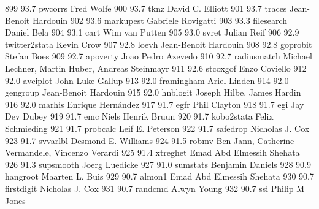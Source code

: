    899     93.7    pwcorrs       Fred Wolfe                              
   900     93.7    tknz          David C. Elliott                        
   901     93.7    traces        Jean-Benoit Hardouin                    
   902     93.6    markupest     Gabriele Rovigatti                      
   903     93.3    filesearch    Daniel Bela                             
   904     93.1    cart          Wim van Putten                          
   905     93.0    svret         Julian Reif                             
   906     92.9    twitter2stata  Kevin Crow                              
   907     92.8    loevh         Jean-Benoit Hardouin                    
   908     92.8    goprobit      Stefan Boes                             
   909     92.7    apoverty      Joao Pedro Azevedo                      
   910     92.7    radiusmatch   Michael Lechner, Martin Huber, Andreas  
                                   Steinmayr                               
   911     92.6    stcoxgof      Enzo Coviello                           
   912     92.0    avciplot      John Luke Gallup                        
   913     92.0    framingham    Ariel Linden                            
   914     92.0    gengroup      Jean-Benoit Hardouin                    
   915     92.0    hnblogit      Joseph Hilbe, James Hardin              
   916     92.0    marhis        Enrique Hernández                      
   917     91.7    egfr          Phil Clayton                            
   918     91.7    egi           Jay Dev Dubey                           
   919     91.7    emc           Niels Henrik Bruun                      
   920     91.7    kobo2stata    Felix Schmieding                        
   921     91.7    probcalc      Leif E. Peterson                        
   922     91.7    safedrop      Nicholas J. Cox                         
   923     91.7    svvarlbl      Desmond E. Williams                     
   924     91.5    robmv         Ben Jann, Catherine Vermandele,         
                                   Vincenzo Verardi                        
   925     91.4    xtreghet      Emad Abd Elmessih Shehata               
   926     91.3    supsmooth     Joerg Luedicke                          
   927     91.0    sumstats      Benjamin Daniels                        
   928     90.9    hangroot      Maarten L. Buis                         
   929     90.7    almon1        Emad Abd Elmessih Shehata               
   930     90.7    firstdigit    Nicholas J. Cox                         
   931     90.7    randcmd       Alwyn Young                             
   932     90.7    ssi           Philip M Jones                          
